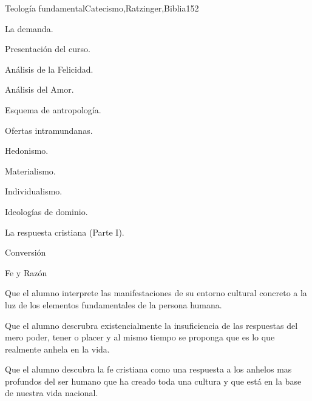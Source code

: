 \begin{syllabus}
\begin{unit}{Teología fundamental}{Catecismo,Ratzinger,Biblia}{15}{2}
\begin{topics}
	\item La demanda. 
	      \begin{inparaenum}
		    \item Presentación del curso.
		    \item Análisis de la Felicidad.
		    \item Análisis del Amor.
		    \item Esquema de antropología.
	      \end{inparaenum}
	\item Ofertas intramundanas. 
	      \begin{inparaenum}
		    \item Hedonismo.
		    \item Materialismo.
		    \item Individualismo.
		    \item Ideologías de dominio.
	      \end{inparaenum}
	\item La respuesta cristiana (Parte I). 
	      \begin{inparaenum}
		    \item Conversión
		    \item Fe y Razón
	      \end{inparaenum}
\end{topics}
\begin{learningoutcomes}
	\item Que el alumno interprete las manifestaciones de su entorno cultural concreto a la luz de los elementos fundamentales de la persona humana.
	\item Que el alumno descrubra existencialmente la insuficiencia de las respuestas del mero poder, tener o placer y al mismo tiempo se proponga que es lo que realmente anhela en la vida.
	\item Que el alumno descubra la fe cristiana como una respuesta a los anhelos mas profundos del ser humano que ha creado toda una cultura y que está en la base de nuestra vida nacional.
\end{learningoutcomes}
\end{unit}


\end{syllabus}
